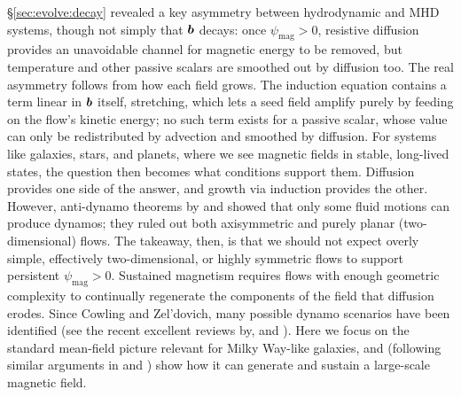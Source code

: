 \S\ref{sec:evolve:decay} revealed a key asymmetry between hydrodynamic and MHD systems, though not simply that $\bm{b}$ decays: once $\psi_\mathrm{mag} > 0$, resistive diffusion provides an unavoidable channel for magnetic energy to be removed, but temperature and other passive scalars are smoothed out by diffusion too. The real asymmetry follows from how each field grows. The induction equation contains a term linear in $\bm{b}$ itself, stretching, which lets a seed field amplify purely by feeding on the flow's kinetic energy; no such term exists for a passive scalar, whose value can only be redistributed by advection and smoothed by diffusion. For systems like galaxies, stars, and planets, where we see magnetic fields in stable, long-lived states, the question then becomes what conditions support them. Diffusion provides one side of the answer, and growth via induction provides the other. However, anti-dynamo theorems by \citet{cowling1933magnetic} and \citet{zil1957magnetic} showed that only some fluid motions can produce dynamos; they ruled out both axisymmetric and purely planar (two-dimensional) flows. The takeaway, then, is that we should not expect overly simple, effectively two-dimensional, or highly symmetric flows to support persistent $\psi_\mathrm{mag} > 0$. Sustained magnetism requires flows with enough geometric complexity to continually regenerate the components of the field that diffusion erodes. Since Cowling and Zel'dovich, many possible dynamo scenarios have been identified (see the recent excellent reviews by, \eg \citealt{rincon2019dynamo} and \citealt{brandenburg2023galactic}). Here we focus on the standard mean-field picture relevant for Milky Way-like galaxies, and (following similar arguments in \eg \citealt{choudhuri1998physics} and \citealt{rincon2019dynamo}) show how it can generate and sustain a large-scale magnetic field.

